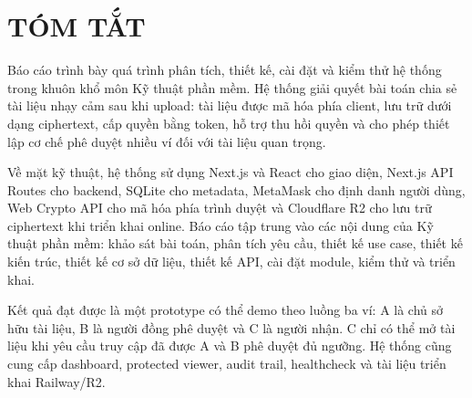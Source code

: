 \chapter*{TÓM TẮT}
{}

Báo cáo trình bày quá trình phân tích, thiết kế, cài đặt và kiểm thử hệ thống \projectname{} trong khuôn khổ môn Kỹ thuật phần mềm. Hệ thống giải quyết bài toán chia sẻ tài liệu nhạy cảm sau khi upload: tài liệu được mã hóa phía client, lưu trữ dưới dạng ciphertext, cấp quyền bằng token, hỗ trợ thu hồi quyền và cho phép thiết lập cơ chế phê duyệt nhiều ví đối với tài liệu quan trọng.

Về mặt kỹ thuật, hệ thống sử dụng Next.js và React cho giao diện, Next.js API Routes cho backend, SQLite cho metadata, MetaMask cho định danh người dùng, Web Crypto API cho mã hóa phía trình duyệt và Cloudflare R2 cho lưu trữ ciphertext khi triển khai online. Báo cáo tập trung vào các nội dung của Kỹ thuật phần mềm: khảo sát bài toán, phân tích yêu cầu, thiết kế use case, thiết kế kiến trúc, thiết kế cơ sở dữ liệu, thiết kế API, cài đặt module, kiểm thử và triển khai.

Kết quả đạt được là một prototype có thể demo theo luồng ba ví: A là chủ sở hữu tài liệu, B là người đồng phê duyệt và C là người nhận. C chỉ có thể mở tài liệu khi yêu cầu truy cập đã được A và B phê duyệt đủ ngưỡng. Hệ thống cũng cung cấp dashboard, protected viewer, audit trail, healthcheck và tài liệu triển khai Railway/R2.

\clearpage

